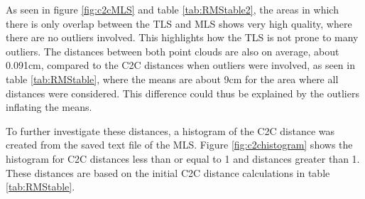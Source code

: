 \documentclass[man]{apa7}
\begin{document}
As seen in figure \ref{fig:c2cMLS} and table \ref{tab:RMStable2}, the areas in which there is only overlap between the TLS and MLS shows very high quality, where there are no outliers involved. This highlights how the TLS is not prone to many outliers. The distances between both point clouds are also on average, about 0.091cm, compared to the C2C distances when outliers were involved, as seen in table \ref{tab:RMStable}, where the means are about 9cm for the area where all distances were considered. This difference could thus be explained by the outliers inflating the means.

To further investigate these distances, a histogram of the C2C distance was created from the saved text file of the MLS. Figure \ref{fig:c2chistogram} shows the histogram for C2C distances less than or equal to 1 and distances greater than 1. These distances are based on the initial C2C distance calculations in table \ref{tab:RMStable}.
\end{document}
